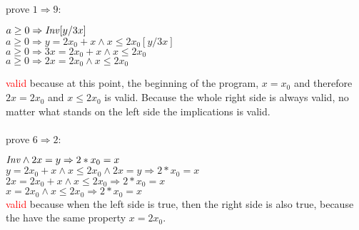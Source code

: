\documentclass[a4paper]{scrartcl}
\begin{document}
\\
prove $1 \Rightarrow 9$:\\
\begin{center}
$a\geq0 \Rightarrow \mathit{Inv}[y/3x]$\\
$a\geq0 \Rightarrow y = 2x_0 + x \land x \leq 2x_0[y/3x]$\\
$a\geq0 \Rightarrow 3x = 2x_0 + x \land x \leq 2x_0$\\
$a\geq0 \Rightarrow 2x = 2x_0 \land x \leq 2x_0$\\
\end{center} 
\textcolor{red}{valid} because at this point, the beginning of the program, $x = x_0$ and therefore $2x = 2x_0$ and $x \leq 2x_0$ is valid.
Because the whole right side is always valid, no matter what stands on the left side the implications is valid.\\
\\
prove $6 \Rightarrow 2$:\\
\begin{center}
$\mathit{Inv} \land 2x = y \Rightarrow 2*x_0 = x$\\
$y = 2x_0 + x \land x \leq 2x_0 \land 2x = y \Rightarrow 2*x_0 = x$\\
$2x = 2x_0 + x \land x \leq 2x_0 \Rightarrow 2*x_0 = x$\\
$x = 2x_0 \land x \leq 2x_0 \Rightarrow 2*x_0 = x$\\
\textcolor{red}{valid} because when the left side is true, then the right side is also true, because the have the same property $x = 2x_0$.
\end{center} 
\end{document}
